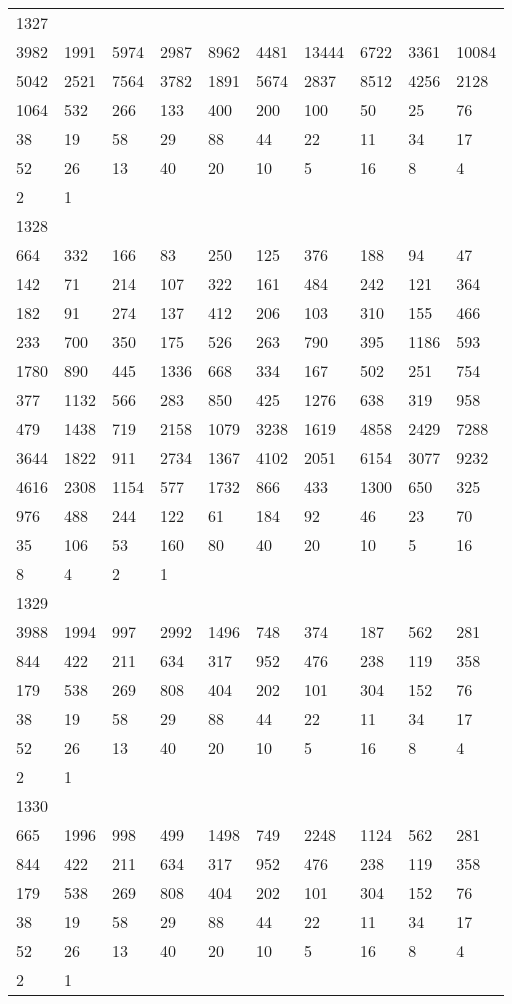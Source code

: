 \begin{longtable}{*{10}{l}}
1327&&&&&&&&&\\
3982& 1991& 5974& 2987& 8962& 4481& 13444& 6722& 3361& 10084\\
5042& 2521& 7564& 3782& 1891& 5674& 2837& 8512& 4256& 2128\\
1064& 532& 266& 133& 400& 200& 100& 50& 25& 76\\
38& 19& 58& 29& 88& 44& 22& 11& 34& 17\\
52& 26& 13& 40& 20& 10& 5& 16& 8& 4\\
2& 1& \\

1328&&&&&&&&&\\
664& 332& 166& 83& 250& 125& 376& 188& 94& 47\\
142& 71& 214& 107& 322& 161& 484& 242& 121& 364\\
182& 91& 274& 137& 412& 206& 103& 310& 155& 466\\
233& 700& 350& 175& 526& 263& 790& 395& 1186& 593\\
1780& 890& 445& 1336& 668& 334& 167& 502& 251& 754\\
377& 1132& 566& 283& 850& 425& 1276& 638& 319& 958\\
479& 1438& 719& 2158& 1079& 3238& 1619& 4858& 2429& 7288\\
3644& 1822& 911& 2734& 1367& 4102& 2051& 6154& 3077& 9232\\
4616& 2308& 1154& 577& 1732& 866& 433& 1300& 650& 325\\
976& 488& 244& 122& 61& 184& 92& 46& 23& 70\\
35& 106& 53& 160& 80& 40& 20& 10& 5& 16\\
8& 4& 2& 1& \\

1329&&&&&&&&&\\
3988& 1994& 997& 2992& 1496& 748& 374& 187& 562& 281\\
844& 422& 211& 634& 317& 952& 476& 238& 119& 358\\
179& 538& 269& 808& 404& 202& 101& 304& 152& 76\\
38& 19& 58& 29& 88& 44& 22& 11& 34& 17\\
52& 26& 13& 40& 20& 10& 5& 16& 8& 4\\
2& 1& \\

1330&&&&&&&&&\\
665& 1996& 998& 499& 1498& 749& 2248& 1124& 562& 281\\
844& 422& 211& 634& 317& 952& 476& 238& 119& 358\\
179& 538& 269& 808& 404& 202& 101& 304& 152& 76\\
38& 19& 58& 29& 88& 44& 22& 11& 34& 17\\
52& 26& 13& 40& 20& 10& 5& 16& 8& 4\\
2& 1& \\


\end{longtable}
